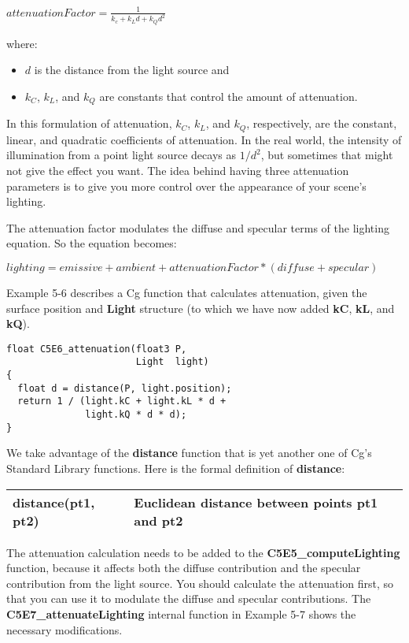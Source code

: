 \documentclass[../main.tex]{subfiles}
\begin{document}
$attenuationFactor = \frac{1}{k_c + k_Ld + k_Qd^2}$

where:

\begin{itemize}
\item $d$ is the distance from the light source and
\item $k_C$, $k_L$, and $k_Q$ are constants that control the amount of attenuation.
\end{itemize}

In this formulation of attenuation, $k_C$, $k_L$, and $k_Q$, respectively, are the constant, linear, and quadratic coefficients of attenuation. In the real world, the intensity of illumination from a point light source decays as $1/d^2$, but sometimes that might not give the effect you want. The idea behind having three attenuation parameters is to give you more control over the appearance of your scene's lighting.

The attenuation factor modulates the diffuse and specular terms of the lighting equation. So the equation becomes:

$lighting = emissive + ambient + attenuationFactor * (diffuse + specular)$

Example 5-6 describes a Cg function that calculates attenuation, given the surface position and \textbf{Light} structure (to which we have now added \textbf{kC}, \textbf{kL}, and \textbf{kQ}).

\FloatBarrier
\begin{lstlisting}[caption=Example 5-6. The \textbf{C5E6_attenuation} Internal Function]
float C5E6_attenuation(float3 P,
                       Light  light)
{
  float d = distance(P, light.position);
  return 1 / (light.kC + light.kL * d +
              light.kQ * d * d);
}
\end{lstlisting}
\FloatBarrier

We take advantage of the \textbf{distance} function that is yet another one of Cg's Standard Library functions. Here is the formal definition of \textbf{distance}:

\FloatBarrier
\begin{table}
\centering
\begin{tabular}{ p{5cm} p{7cm}  } 
\hline
\textbf{distance(pt1, pt2)} & Euclidean distance between points \textbf{pt1} and \textbf{pt2} \\
\hline
\end{tabular}
\end{table}
\FloatBarrier

The attenuation calculation needs to be added to the \textbf{C5E5_computeLighting} function, because it affects both the diffuse contribution and the specular contribution from the light source. You should calculate the attenuation first, so that you can use it to modulate the diffuse and specular contributions. The \textbf{C5E7_attenuateLighting} internal function in Example 5-7 shows the necessary modifications.
\end{document}
